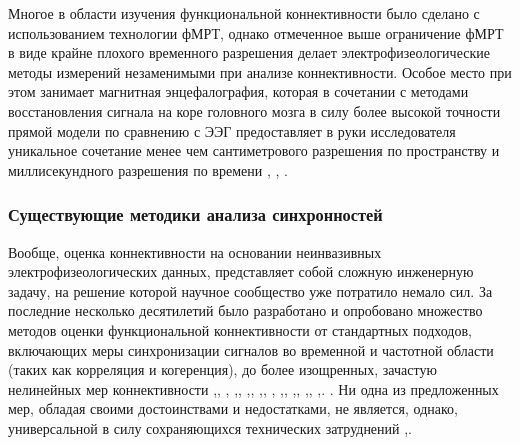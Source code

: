 Многое в области изучения функциональной коннективности было сделано с использованием технологии фМРТ, 
однако отмеченное выше ограничение фМРТ в виде крайне плохого временного разрешения делает электрофизеологические 
методы измерений незаменимыми при анализе коннективности. Особое место при этом занимает магнитная энцефалография, 
которая в сочетании с методами восстановления сигнала на коре головного мозга
в силу более высокой точности прямой модели по сравнению с ЭЭГ предоставляет
в руки исследователя уникальное сочетание менее чем сантиметрового разрешения по пространству
и миллисекундного разрешения по времени , 
, . 


\subsubsection*{Существующие методики анализа синхронностей}

Вообще, оценка коннективности на основании неинвазивных электрофизеологических данных,
 представляет собой сложную инженерную задачу,
на решение которой научное сообщество уже потратило немало сил.
За последние несколько десятилетий было разработано и опробовано множество методов
оценки функциональной коннективности от стандартных подходов,
включающих меры синхронизации сигналов во временной и
частотной области (таких как корреляция и когеренция), до более изощренных,
зачастую нелинейных мер коннективности
,,
,
,,
,,
,,
,
,,
,,
,,
,.
.
Ни одна из предложенных мер, обладая своими достоинствами и недостатками, не является, однако, универсальной в силу 
сохраняющихся технических затруднений ,.

